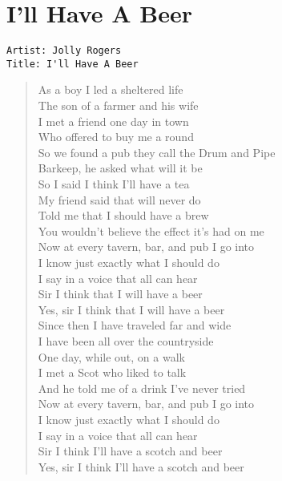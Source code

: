 \documentclass[11pt]{article}
\begin{document}
\section{I'll Have A Beer}
\label{sec:org616f37f}
\begin{verbatim}
Artist: Jolly Rogers
Title: I'll Have A Beer
\end{verbatim}
\begin{verse}
As a boy I led a sheltered life\\
The son of a farmer and his wife\\
I met a friend one day in town\\
Who offered to buy me a round\\
So we found a pub they call the Drum and Pipe\\
\vspace*{1em}
Barkeep, he asked what will it be\\
So I said I think I'll have a tea\\
My friend said that will never do\\
Told me that I should have a brew\\
You wouldn't believe the effect it's had on me\\
\vspace*{1em}
Now at every tavern, bar, and pub I go into\\
I know just exactly what I should do\\
I say in a voice that all can hear\\
Sir I think that I will have a beer\\
Yes, sir I think that I will have a beer\\
\vspace*{1em}
Since then I have traveled far and wide\\
I have been all over the countryside\\
One day, while out, on a walk\\
I met a Scot who liked to talk\\
And he told me of a drink I've never tried\\
\vspace*{1em}
Now at every tavern, bar, and pub I go into\\
I know just exactly what I should do\\
I say in a voice that all can hear\\
Sir I think I'll have a scotch and beer\\
Yes, sir I think I'll have a scotch and beer\\

\end{verse}
\end{document}
